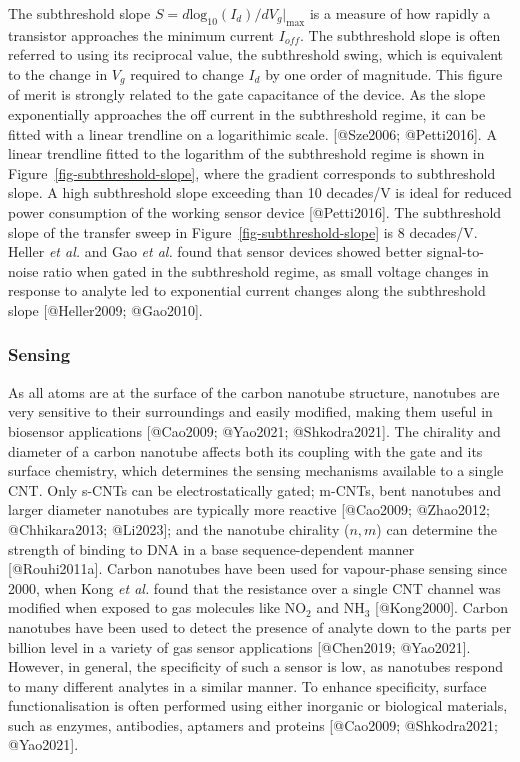 \documentclass[
  letterpaper,
  DIV=11,
  numbers=noendperiod]{scrartcl}
\begin{document}
The subthreshold slope
\(S = d\textrm{log}_{10}(I_{d})/dV_g|_{\textrm{max}}\) is a measure of
how rapidly a transistor approaches the minimum current \(I_{off}\). The
subthreshold slope is often referred to using its reciprocal value, the
subthreshold swing, which is equivalent to the change in \(V_g\)
required to change \(I_d\) by one order of magnitude. This figure of
merit is strongly related to the gate capacitance of the device. As the
slope exponentially approaches the off current in the subthreshold
regime, it can be fitted with a linear trendline on a logarithimic
scale. {[}@Sze2006; @Petti2016{]}. A linear trendline fitted to the
logarithm of the subthreshold regime is shown in
Figure~\ref{fig-subthreshold-slope}, where the gradient corresponds to
subthreshold slope. A high subthreshold slope exceeding than 10
decades/V is ideal for reduced power consumption of the working sensor
device {[}@Petti2016{]}. The subthreshold slope of the transfer sweep in
Figure~\ref{fig-subthreshold-slope} is 8 decades/V. Heller \emph{et al.}
and Gao \emph{et al.} found that sensor devices showed better
signal-to-noise ratio when gated in the subthreshold regime, as small
voltage changes in response to analyte led to exponential current
changes along the subthreshold slope {[}@Heller2009; @Gao2010{]}.

\subsubsection{Sensing}\label{sec-CNT-sensing-mechanisms}

As all atoms are at the surface of the carbon nanotube structure,
nanotubes are very sensitive to their surroundings and easily modified,
making them useful in biosensor applications {[}@Cao2009; @Yao2021;
@Shkodra2021{]}. The chirality and diameter of a carbon nanotube affects
both its coupling with the gate and its surface chemistry, which
determines the sensing mechanisms available to a single CNT. Only s-CNTs
can be electrostatically gated; m-CNTs, bent nanotubes and larger
diameter nanotubes are typically more reactive {[}@Cao2009; @Zhao2012;
@Chhikara2013; @Li2023{]}; and the nanotube chirality (\(n,m\)) can
determine the strength of binding to DNA in a base sequence-dependent
manner {[}@Rouhi2011a{]}. Carbon nanotubes have been used for
vapour-phase sensing since 2000, when Kong \emph{et al.} found that the
resistance over a single CNT channel was modified when exposed to gas
molecules like NO\(_2\) and NH\(_3\) {[}@Kong2000{]}. Carbon nanotubes
have been used to detect the presence of analyte down to the parts per
billion level in a variety of gas sensor applications {[}@Chen2019;
@Yao2021{]}. However, in general, the specificity of such a sensor is
low, as nanotubes respond to many different analytes in a similar
manner. To enhance specificity, surface functionalisation is often
performed using either inorganic or biological materials, such as
enzymes, antibodies, aptamers and proteins {[}@Cao2009; @Shkodra2021;
@Yao2021{]}.
\end{document}
